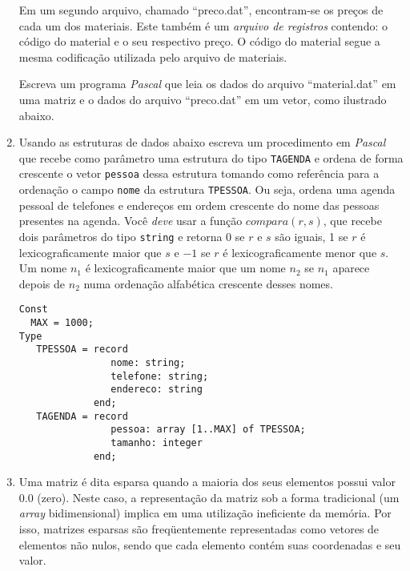 \begin{enumerate}
Em um segundo arquivo, chamado ``preco.dat'', encontram-se os
preços de cada um dos materiais.
Este também é um {\em arquivo de registros} contendo: o código do material
e o seu 
respectivo preço.   O código do material segue a mesma codificação
utilizada pelo arquivo de materiais.

Escreva um programa \emph{Pascal} que leia os dados do arquivo ``material.dat'' em
uma matriz e o dados do arquivo ``preco.dat'' em um vetor, como ilustrado
abaixo.

\item Usando as estruturas de dados abaixo escreva um procedimento em
\emph{Pascal} que recebe como parâmetro uma estrutura do tipo 
\verb+TAGENDA+ e ordena de forma crescente o vetor \verb+pessoa+ 
dessa estrutura tomando como referência para a ordenação  
o campo \verb+nome+ da estrutura \verb+TPESSOA+. Ou seja,
ordena uma agenda pessoal de telefones e endereços em ordem 
crescente do nome das pessoas presentes na agenda.
Você \emph{deve} usar a função $compara( r, s )$, que recebe dois 
parâmetros do tipo \verb+string+ e retorna 0 se $r$ e $s$ são
iguais, 1 se $r$ é lexicograficamente maior que $s$ e $-1$ 
se $r$ é lexicograficamente menor que $s$. Um nome $n_1$ é 
lexicograficamente maior que um nome $n_2$ se $n_1$ aparece 
depois de $n_2$ numa ordenação alfabética crescente desses
nomes.
\begin{center}
\begin{small}
\begin{verbatim}
Const
  MAX = 1000;
Type
   TPESSOA = record
                nome: string;
                telefone: string;
                endereco: string
             end; 
   TAGENDA = record
                pessoa: array [1..MAX] of TPESSOA;
                tamanho: integer
             end;
\end{verbatim}
\end{small}
\end{center}

\item Uma matriz é dita esparsa quando a maioria dos seus elementos possui valor $0.0$
(zero). Neste caso, a representação da matriz sob a forma tradicional (um
\emph{array} bidimensional) implica em uma utilização ineficiente da memória.
Por isso, matrizes esparsas são freqüentemente representadas como vetores de
elementos não nulos, sendo que cada elemento contém suas coordenadas e seu
valor.


\end{enumerate}
